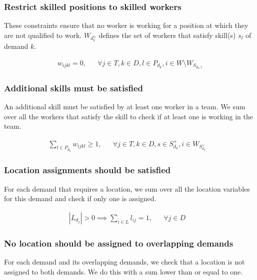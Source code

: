 \documentclass[../../thesis.tex]{subfiles}
\begin{document}
\subsubsection{Restrict skilled positions to skilled workers}

These constraints ensure that no worker is working for a position at which they are not qualified to work.
$W_{d^{s_l}_k}$ defines the set of workers that satisfy skill(s) $s_l$ of demand $k$. 

\begin{align}
  w_{ijkl} = 0, && \forall j \in T, k \in D, l \in P_{d_k}, i \in W \setminus W_{S_{d_k,l}}  \label{wc6}
\end{align}

\subsubsection{Additional skills must be satisfied}

An additional skill must be satisfied by at least one worker in a team. We sum 
over all the workers that satisfy the skill to check if at least one is working in the team.

\begin{align}
  \sum_{l \in P_{d_k}} w_{ijkl} \geq 1, && \forall j \in T, k \in D, s \in S^{+}_{d_k}, i \in W_{S^{+}_{d_k}}& \label{wc8}
\end{align}


\subsubsection{Location assignments should be satisfied}

For each demand that requires a location, we sum over all the location variables for this demand and check if only one is assigned.

\begin{align}
  |L_{d_j}| > 0 \implies \sum_{i \in L} l_{ij} = 1, && \forall j \in D& \label{lc2}
\end{align}

\subsubsection{No location should be assigned to overlapping demands}

For each demand and its overlapping demands, we check that a location is not assigned to both demands.
We do this with a sum lower than or equal to one.
\end{document}
